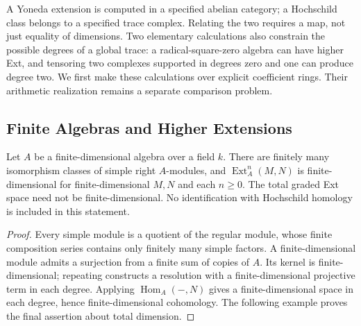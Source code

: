 A Yoneda extension is computed in a specified abelian category; a
Hochschild class belongs to a specified trace complex. Relating the two
requires a map, not just equality of dimensions. Two elementary
calculations also constrain the possible degrees of a global trace:
a radical-square-zero algebra can have higher Ext, and tensoring two
complexes supported in degrees zero and one can produce degree two.
We first make these calculations over explicit coefficient rings.
Their arithmetic realization remains a separate comparison problem.

\subsection{Finite Algebras and Higher Extensions}

\begin{lemma}
\label{v4-arith:bzn-rcompletion:lem:EO-ext}
Let \(A\) be a finite-dimensional algebra over a field \(k\).
There are finitely many isomorphism classes of simple right
\(A\)-modules, and \(\operatorname{Ext}^n_A(M,N)\) is finite-dimensional
for finite-dimensional \(M,N\) and each \(n\ge0\).
The total graded Ext space need not be finite-dimensional.
No identification with Hochschild homology is included in this statement.
\end{lemma}
\begin{proof}
Every simple module is a quotient of the regular module, whose finite
composition series contains only finitely many simple factors.
A finite-dimensional module admits a surjection from a finite sum of
copies of \(A\). Its kernel is finite-dimensional; repeating constructs
a resolution with a finite-dimensional projective term in each degree.
Applying \(\operatorname{Hom}_A(-,N)\) gives a finite-dimensional space
in each degree, hence finite-dimensional cohomology. The following
example proves the final assertion about total dimension.
\end{proof}

